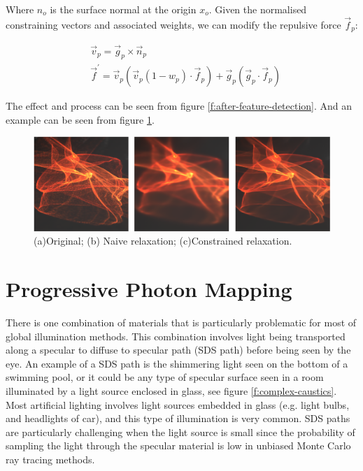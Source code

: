 Where $n_o$ is the surface normal at the origin $x_o$. Given the normalised constraining vectors and associated weights, we can modify the repulsive force $\vec{f}_p$:

\begin{equation}
	\begin{aligned}
		&\vec{v}_p=\vec{g}_p\times\vec{n}_p\\
		&\vec{f}^{'}=\vec{v}_p(\vec{v}_p(1-w_p)\cdot\vec{f}_p)+\vec{g}_p(\vec{g}_p\cdot\vec{f}_p)
	\end{aligned}
\end{equation}

The effect and process can be seen from figure \ref{f:after-feature-detection}. And an example can be seen from figure \ref{f:photon-relaxation-example}.

\begin{figure}\label{f:photon-relaxation-example}
	\includegraphics[width=1.0\textwidth]{graphics/pm/pm-16-2}
	\caption{(a)Original; (b) Naive relaxation; (c)Constrained relaxation.}
\end{figure}







\section{Progressive Photon Mapping}
There is one combination of materials that is particularly problematic for most of global illumination methods. This combination involves light being transported along a specular to diffuse to specular path (SDS path) before being seen by the eye. An example of a SDS path is the shimmering light seen on the bottom of a swimming pool, or it could be any type of specular surface seen in a room illuminated by a light source enclosed in glass, see figure \ref{f:complex-caustics}. Most artificial lighting involves light sources embedded in glass (e.g. light bulbs, and headlights of car), and this type of illumination is very common. SDS paths are particularly challenging when the light source is small since the probability of sampling the light through the specular material is low in unbiased Monte Carlo ray tracing methods.

